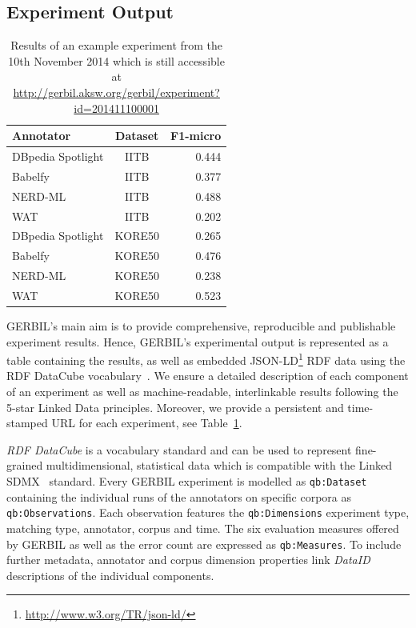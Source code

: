 \subsection{Experiment Output}
\label{sec:output}

\begin{table}[tb!]
    \begin{tabular}{lcr}
    \toprule
    Annotator & Dataset & F1-micro \\
    \midrule
    DBpedia Spotlight & IITB & 0.444 \\
    Babelfy & IITB & 0.377 \\
    NERD-ML & IITB & 0.488 \\
    WAT & IITB & 0.202 \\
    DBpedia Spotlight & KORE50 & 0.265 \\
    Babelfy & KORE50 & 0.476 \\
    NERD-ML & KORE50 & 0.238 \\
    WAT & KORE50 & 0.523 \\
	\bottomrule
	\end{tabular}
	\centering
    \caption{Results of an example experiment from the 10th November 2014 which is still accessible at \url{http://gerbil.aksw.org/gerbil/experiment?id=201411100001}}
	\label{tab:persistentURL}
\end{table}

GERBIL's main aim is to provide comprehensive, reproducible and publishable experiment results.
Hence, GERBIL's experimental output is represented as a table containing the results, as well as embedded JSON-LD\footnote{\url{http://www.w3.org/TR/json-ld/}} \ac{RDF} data using the RDF DataCube vocabulary~\cite{datacube}.
We ensure a detailed description of each component of an experiment as well as machine-readable, interlinkable results following the 5-star Linked Data principles.
Moreover, we provide a persistent and time-stamped URL for each experiment, see Table~\ref{tab:persistentURL}.


\emph{RDF DataCube} is a vocabulary standard and can be used to represent fine-grained multidimensional, statistical data which is compatible with the  Linked SDMX~\cite{LinkedSDMX} standard. 
Every GERBIL experiment is modelled as \texttt{qb:Dataset} containing the individual runs of the annotators on specific corpora as \texttt{qb:Observations}. 
Each observation features the \texttt{qb:Dimensions} experiment type, matching type, annotator, corpus and time. 
The six evaluation measures offered by GERBIL as well as the error count are expressed as \texttt{qb:Measures}. 
To include further metadata, annotator and corpus dimension properties link \emph{DataID}~\cite{dataID} descriptions of the individual components. 

